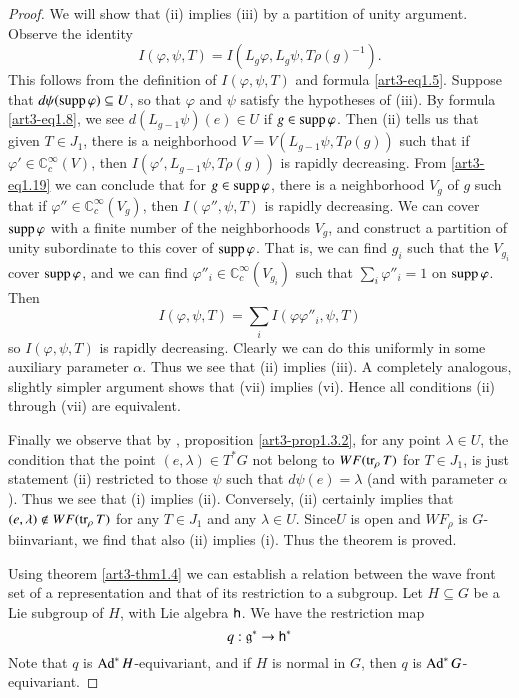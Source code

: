 \begin{proof}
We will show that (ii) implies (iii) by a partition of unity argument. Observe the identity
\begin{equation*}
I(\varphi,\psi,T)=I(L_{g}\varphi,L_{g}\psi,T\rho(g)^{-1}).\tag{1.19}\label{art3-eq1.19}
\end{equation*}
This follows from the definition of $I(\varphi,\psi,T)$ and formula \eqref{art3-eq1.5}. Suppose that $d\psi(\operatorname{supp} \varphi)\subseteq U$, so that $\varphi$ and $\psi$ satisfy the hypotheses of (iii). By formula \eqref{art3-eq1.8}, we see $d(L_{g-1}\psi)(e)\in U$ if $g\in \operatorname{supp} \varphi$. Then (ii) tells us that given $T\in J_{1}$, there is a neighborhood $V=V(L_{g-1}\psi,T\rho(g))$ such that if $\varphi'\in \mathbb{C}^{\infty}_{c}(V)$, then $I(\varphi',L_{g-1}\psi,T\rho(g))$ is rapidly decreasing. From \eqref{art3-eq1.19} we can conclude that for $g\in \operatorname{supp} \varphi$, there is a neighborhood $V_{g}$ of $g$ such that if $\varphi''\in \mathbb{C}^{\infty}_{c}(V_{g})$, then $I(\varphi'',\psi,T)$ is rapidly decreasing. We can cover $\operatorname{supp} \varphi$ with a finite number of the neighborhoods $V_{g}$, and construct a partition of unity subordinate to this cover of $\operatorname{supp} \varphi$. That is, we can find $g_{i}$ such that the $V_{g_{i}}$ cover $\operatorname{supp} \varphi$, and we can find $\varphi''_{i}\in \mathbb{C}^{\infty}_{c}(V_{g_{i}})$ such that $\sum\limits_{i}\varphi''_{i}=1$ on $\operatorname{supp} \varphi$. Then
$$
I(\varphi,\psi,T)=\sum\limits_{i}I(\varphi\varphi''_{i},\psi,T)
$$
so $I(\varphi,\psi,T)$ is rapidly decreasing. Clearly we can do this uniformly in some auxiliary parameter $\alpha$. Thus we see that (ii) implies (iii). A completely analogous, slightly simpler argument shows that (vii) implies (vi). Hence all conditions (ii) through (vii) are equivalent.

Finally we observe that by \cite{art3-D}, proposition \ref{art3-prop1.3.2}, for any point $\lambda\in U$, the condition that the point $(e,\lambda)\in T^{*}G$ not belong to $WF(\operatorname{tr}_{\rho}T)$ for $T\in J_{1}$, is just statement (ii) restricted to those $\psi$ such that $d\psi(e)=\lambda$ (and with parameter $\alpha$). Thus we see that (i) implies (ii). Conversely, (ii) certainly implies that $(e,\lambda)\not\in WF(\operatorname{tr}_{\rho}T)$ for any $T\in J_{1}$ and any $\lambda\in U$. Since\pageoriginale $U$ is open and $WF_{\rho}$ is $G$-biinvariant, we find that also (ii) implies (i). Thus the theorem is proved.

Using theorem \ref{art3-thm1.4} we can establish a relation between the wave front set of a representation and that of its restriction to a subgroup. Let $H\subseteq G$ be a Lie subgroup of $H$, with Lie algebra $\mathsf{h}$. We have the restriction map
$$
q:\mathfrak{g}^{*}\to \mathsf{h}^{*}
$$
Note that $q$ is $\operatorname{Ad}^{*}H$-equivariant, and if $H$ is normal in $G$, then $q$ is $\operatorname{Ad}^{*}G$-equivariant.
\end{proof}

